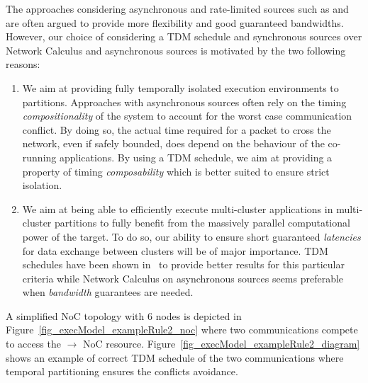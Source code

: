 \documentclass[main.tex]{subfiles}
\begin{document}
The approaches considering asynchronous and rate-limited sources such as
\cite{Dinechin2014} and \cite{Giannopoulou2015} are often argued to provide
more flexibility and good guaranteed bandwidths. However, our choice of
considering a TDM schedule and synchronous sources over Network Calculus and
asynchronous sources is motivated by the two following reasons:

\begin{enumerate}
    \item We aim at providing fully temporally isolated execution environments
        to partitions. Approaches with asynchronous sources often rely on the
        timing \emph{compositionality} of the system to account for the worst
        case communication conflict. By doing so, the actual time required for
        a packet to cross the network, even if safely bounded, does depend on
        the behaviour of the co-running applications. By using a TDM schedule,
        we aim at providing a property of timing \emph{composability} which is
        better suited to ensure strict isolation.
    \item We aim at being able to efficiently execute multi-cluster
        applications in multi-cluster partitions to fully benefit from the
        massively parallel computational power of the target. To do so, our
        ability to ensure short guaranteed \emph{latencies} for data exchange
        between clusters will be of major importance. TDM schedules have been
        shown in~\cite{Puffitsch2015} to provide better results for this
        particular criteria while Network Calculus on asynchronous sources
        seems preferable when \emph{bandwidth} guarantees are needed.
\end{enumerate}

\begin{example}
    A simplified NoC topology with 6 nodes is depicted in
Figure~\ref{fig_execModel_exampleRule2_noc} where two communications compete to
access the  $\to$  NoC resource.
Figure~\ref{fig_execModel_exampleRule2_diagram} shows an example of correct TDM
schedule of the two communications where temporal partitioning ensures the
conflicts avoidance.  \end{example}
\end{document}
